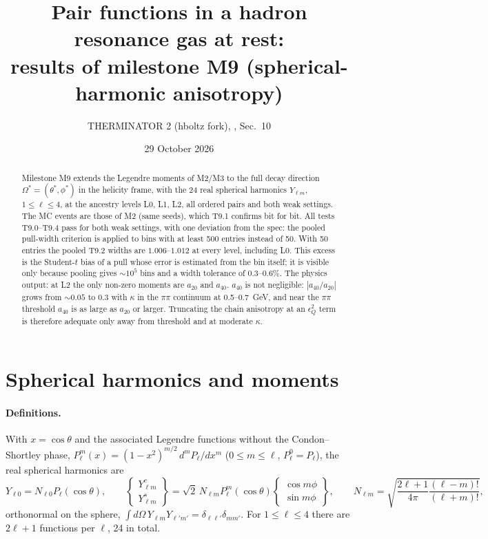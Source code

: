 \documentclass[11pt,a4paper]{article}
\title{Pair functions in a hadron resonance gas at rest:\\ results of milestone M9
(spherical-harmonic anisotropy)}
\author{THERMINATOR 2 (hboltz fork), \code{src/work/hrg\_pair\_density\_spec.md}, Sec.~10}
\date{29 October 2026}
\begin{document}
\maketitle

\begin{abstract}
\noindent
Milestone M9 extends the Legendre moments of M2/M3 to the full decay direction
$\Omega^*=(\theta^*,\phi^*)$ in the helicity frame, with the 24 real spherical harmonics
$Y_{\ell m}$, $1\le\ell\le4$, at the ancestry levels L0, L1, L2, all ordered pairs and both weak
settings. The MC events are those of M2 (same seeds), which T9.1 confirms bit for bit. All tests
T9.0--T9.4 pass for both weak settings, with one deviation from the spec: the pooled pull-width
criterion is applied to bins with at least 500 entries instead of 50. With 50 entries the pooled
T9.2 widths are $1.006$--$1.012$ at every level, including L0. This excess is the Student-$t$ bias of a
pull whose error is estimated from the bin itself; it is visible only because pooling gives
$\sim10^5$ bins and a width tolerance of 0.3--0.6\%. The physics output: at L2 the only non-zero
moments are $a_{20}$ and $a_{40}$. $a_{40}$ is not negligible: $|a_{40}/a_{20}|$ grows from
$\sim0.05$ to $0.3$ with $\kappa$ in the $\pi\pi$ continuum at 0.5--0.7~GeV, and near the $\pi\pi$
threshold $a_{40}$ is as large as $a_{20}$ or larger. Truncating the chain anisotropy at an
$\epsilon_Q^2$ term is therefore adequate only away from threshold and at moderate $\kappa$.
\end{abstract}

\section{Spherical harmonics and moments}

\paragraph{Definitions.} With $x=\cos\theta$ and the associated Legendre functions without the
Condon--Shortley phase, $P_\ell^m(x)=(1-x^2)^{m/2}\,d^mP_\ell/dx^m$ ($0\le m\le\ell$, $P_\ell^0=P_\ell$),
the real spherical harmonics are
\begin{equation}
Y_{\ell0}=N_{\ell0}P_\ell(\cos\theta),\qquad
\begin{Bmatrix}Y^{c}_{\ell m}\\ Y^{s}_{\ell m}\end{Bmatrix}=\sqrt2\,N_{\ell m}P_\ell^m(\cos\theta)
\begin{Bmatrix}\cos m\phi\\ \sin m\phi\end{Bmatrix},\qquad
N_{\ell m}=\sqrt{\frac{2\ell+1}{4\pi}\frac{(\ell-m)!}{(\ell+m)!}},
\end{equation}
orthonormal on the sphere, $\int d\Omega\,Y_{\ell m}Y_{\ell'm'}=\delta_{\ell\ell'}\delta_{mm'}$. For
$1\le\ell\le4$ there are $2\ell+1$ functions per $\ell$, 24 in total.
\end{document}
